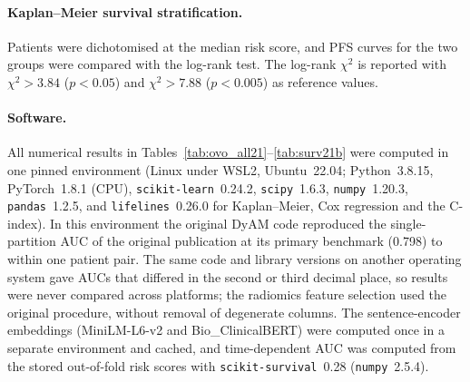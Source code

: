 \paragraph{Kaplan--Meier survival stratification.}
Patients were dichotomised at the median risk score, and PFS curves for the
two groups were compared with the log-rank test.
The log-rank $\chi^2$ is reported with $\chi^2 > 3.84$ ($p < 0.05$) and
$\chi^2 > 7.88$ ($p < 0.005$) as reference values.

\paragraph{Software.}
All numerical results in Tables~\ref{tab:ovo_all21}--\ref{tab:surv21b} were computed in one pinned environment
(Linux under WSL2, Ubuntu~22.04; Python~3.8.15, PyTorch~1.8.1 (CPU), \texttt{scikit-learn}~0.24.2,
\texttt{scipy}~1.6.3, \texttt{numpy}~1.20.3, \texttt{pandas}~1.2.5, and \texttt{lifelines}~0.26.0 for
Kaplan--Meier, Cox regression and the C-index). In this environment the original DyAM code reproduced the
single-partition AUC of the original publication at its primary benchmark (0.798) to within one patient pair.
The same code and library versions on another operating system gave AUCs that differed in the second or
third decimal place, so results were never compared across platforms; the radiomics feature selection used
the original procedure, without removal of degenerate columns. The sentence-encoder embeddings (MiniLM-L6-v2
and Bio\_ClinicalBERT) were computed once in a separate environment and cached, and time-dependent AUC was
computed from the stored out-of-fold risk scores with \texttt{scikit-survival}~0.28 (\texttt{numpy}~2.5.4).
